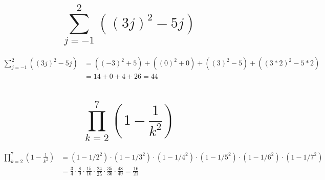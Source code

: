 \begin{parts}
    \part{
        $$\sum_{j=-1}^2{\left((3j)^2-5j\right)}$$
    }
    \begin{solution}
        \begin{align*}
            \sum_{j=-1}^2{\left((3j)^2-5j\right)} &=
            \left((-3)^2+5\right) +
            \left((0)^2+0\right) +
            \left((3)^2-5\right) +
            \left((3*2)^2-5*2\right)\\
            & = 14+0+4+26 = 44
        \end{align*}
    \end{solution}

    \part{
        $$\prod_{k=2}^7{\left(1-\frac{1}{k^2}\right)}$$
    }
    \begin{solution}
        \begin{align*}
            \prod_{k=2}^7{\left(1-\frac{1}{k^2}\right)} &=
            \left(1-1/2^2\right)\cdot
            \left(1-1/3^2\right)\cdot
            \left(1-1/4^2\right)\cdot
            \left(1-1/5^2\right)\cdot
            \left(1-1/6^2\right)\cdot
            \left(1-1/7^2\right)\\
            & = \frac{3}{4} \cdot
            \frac{8}{9} \cdot
            \frac{15}{16} \cdot
            \frac{24}{25} \cdot
            \frac{35}{36} \cdot
            \frac{48}{49}=\frac{16}{21}\\
        \end{align*}
    \end{solution}
\end{parts}
